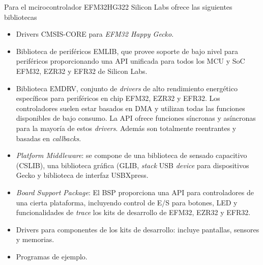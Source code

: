 
Para el mcirocontrolador EFM32HG322 Silicon Labs ofrece las siguientes bibliotecas \citep{EmLibSiliconLabs}

\begin{itemize}
\item
Drivers CMSIS-CORE para \emph{EFM32 Happy Gecko}.
\item
Biblioteca de periféricos EMLIB, que provee soporte de bajo nivel para periféricos proporcionando una API unificada para todos los MCU y SoC EFM32, EZR32 y EFR32 de Silicon Labs.
\item
Biblioteca EMDRV, conjunto de \emph{drivers} de alto rendimiento energético específicos para periféricos en chip EFM32, EZR32 y EFR32. Los controladores suelen estar basados en DMA y utilizan todas las funciones disponibles de bajo consumo. La API ofrece funciones síncronas y asíncronas para la mayoría de estos \emph{drivers}. Además son totalmente reentrantes y basadas en \emph{callbacks}.
\item
\emph{Platform Middleware}: se compone de una biblioteca de sensado capacitivo (CSLIB), una biblioteca gráfica (GLIB, \emph{stack} USB \emph{device} para dispositivos Gecko y biblioteca de interfaz USBXpress.
\item
\emph{Board Support Package}: El BSP proporciona una API para controladores de una cierta plataforma, incluyendo control de E/S para botones, LED y funcionalidades de \emph{trace} los kits de desarrollo de EFM32, EZR32 y EFR32.
\item
Drivers para componentes de los kits de desarrollo: incluye pantallas, sensores y memorias.
\item
Programas de ejemplo.
\end{itemize}
